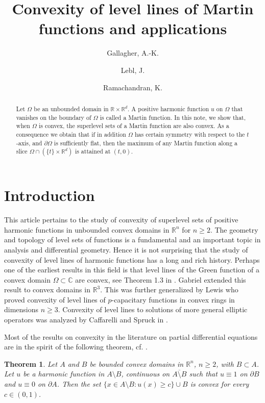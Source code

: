 \documentclass[11pt]{amsart}
\title{Convexity of level lines of Martin functions and applications}
\author{Gallagher, A.-K.}
\author{Lebl, J.}
\author{Ramachandran, K.}
\newtheorem{thm}{Theorem}[section]
\theoremstyle{definition}
\theoremstyle{remark}
\begin{document}
\begin{abstract}
Let $\Omega$ be an unbounded domain in $\mathbb{R}\times\mathbb{R}^{d}.$ A positive harmonic function $u$ on $\Omega$ that vanishes on the boundary of $\Omega$ is called a Martin function. In this note, we show that, when $\Omega$ is convex, the superlevel sets of a Martin function are also convex. As a consequence we obtain that if in addition $\Omega$ has certain symmetry with respect to the $t$-axis, and $\partial\Omega$ is sufficiently flat, then the maximum of any Martin function along a slice $\Omega\cap (\{t\}\times\mathbb{R}^d)$ is attained at $(t,0)$.
\end{abstract}

\maketitle

\section{Introduction}
This article pertains to the study of convexity of superlevel sets of positive harmonic functions in unbounded convex domains in $\mathbb{R}^n$ for $n\geq 2$. The geometry and topology of level sets of functions is a fundamental and an important topic in analysis and differential geometry. Hence it is not surprising that the study of convexity of level lines of harmonic functions has a long and rich history. Perhaps one of the earliest results in this field is that level lines of the Green function of a convex domain $\Omega\subset\mathbb{C}$ are convex, see Theorem 1.3 in \cite{AH}. Gabriel \cite{G} extended this result to convex domains in $\mathbb{R}^3$. This was further generalized by Lewis \cite{JL} who proved convexity of level lines of $p$-capacitary functions in convex rings in dimensions $n\geq 3$. Convexity of level lines to solutions of more general elliptic operators was analyzed by Caffarelli and Spruck in \cite{CS}.

\vspace{0.1in}

 Most of the results on convexity in the literature on partial differential equations are in the spirit of the following theorem, cf. \cite{CS, JL, Long}. 

\begin{thm}\label{Long}
Let $A$ and $B$ be bounded convex domains in $\mathbb{R}^n$, $n\geq 2$, with $B\subset A$. Let $u$ be a harmonic function in $A\setminus B$, continuous on $\overline{A\setminus B}$ such that $u\equiv 1$ on $\partial B$ and $u\equiv 0$ on $\partial A$. Then the set $\{x\in A\setminus B: u(x)\geq c\}\cup B$ is convex for every $c\in(0,1)$.
\end{thm}
\end{document}
